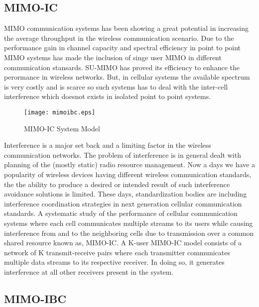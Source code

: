 \subsection{MIMO-IC}
\ac{MIMO} communication systems has been showing a great potential in increasing the average throughput in the wireless communication scenario. Due to the performance gain in channel capacity and spectral efficiency in point to point \ac{MIMO} systems has made the inclusion of singe user \ac{MIMO} in different communication stansards. SU-\ac{MIMO} has proved its efficiency to enhance the perormance in wireless networks. But, in cellular systems the available spectrum is very costly and is scarce so such systems has to deal with the inter-cell interference which doesnot exists in isolated point to point systems.

\begin{figure}[h]
	\begin{center}
		\texttt{[image: mimoibc.eps]}
		\caption{MIMO-IC System Model}
	\end{center}
\end{figure}

Interference is a major set back and a limiting factor in the wireless communication networks. The problem of interference is in general  dealt  with  planning of the  (mostly  static) radio resource management. Now a days we have a popularity of wireless  devices  having  different  wireless  communication standards, the the ability to produce a desired or intended result of such interference avoidance solutions is limited. These days, standardization bodies are including  interference coordination strategies in  next generation  cellular  communication standards.  A  systematic study  of  the  performance of  cellular  communication systems where  each  cell  communicates  multiple  streams to  its  users while causing interference from and to the neighboring cells due  to  transmission  over  a  common  shared  resource  known as, \ac{MIMO}-\ac{IC}. A K-user \ac{MIMO}-\ac{IC} model consists of a network of K transmit-receive  pairs  where each transmitter  communicates  multiple data streams to its respective receiver. In doing so, it generates interference at all other receivers present in the system.



\subsection{MIMO-IBC}

